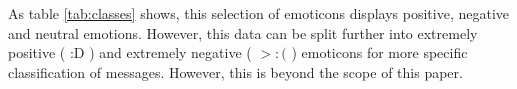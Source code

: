 As table \ref{tab:classes} shows, this selection of emoticons displays positive, negative and neutral emotions. However, this data can be split further into extremely positive ( :D ) and extremely negative ( $>:($ ) emoticons for more specific classification of messages. However, this is beyond the scope of this paper.

\begin{comment}
\red{Finish the introduction, maybe move some parts to the Problem section} \\



\begin{comment}
Introduction (max 2 pages):
• Description of the problem area and the problem itself
• What is the research question / goal?
• Why is this an important / meaningful / interesting problem to consider?
• The very basic idea of the approach and why this is a reasonable approach for this problem?
\end{comment}

